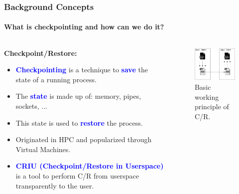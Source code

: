 \documentclass[9pt,    %
    english,            %
    xcolor=table,       %
    envcountsect,        %
    aspectratio=169     %
]{beamer}
\begin{document}
\begin{frame}
    \frametitle{Background Concepts}
    \framesubtitle{What is checkpointing and how can we do it?}

    \vspace{-15pt}

    \begin{columns}[t]
        \begin{column}{.65\textwidth}
            \textbf{Checkpoint/Restore:}
            \begin{itemize}
                \item \textbf{\textcolor{blue}{Checkpointing}} is a technique to \textbf{\textcolor{blue}{save}} the state of a running process.
                \item The \textbf{\textcolor{blue}{state}} is made up of: memory, pipes, sockets, ...
                \item This state is used to \textbf{\textcolor{blue}{restore}} the process.
                \item Originated in HPC and popularized through Virtual Machines.
                \item \textbf{\textcolor{blue}{CRIU (Checkpoint/Restore in Userspace)}} is a tool to perform C/R from userspace transparently to the user.
            \end{itemize}
        \end{column}\hfill
        \begin{column}{.35\textwidth}
            \vspace{-18pt}
            \begin{figure}
                \centering
                \includegraphics[width=.8\textwidth]{./images/cr.png}
                \caption{Basic working principle of C/R.}
            \end{figure}
        \end{column}
    \end{columns}

\end{frame}
\end{document}
